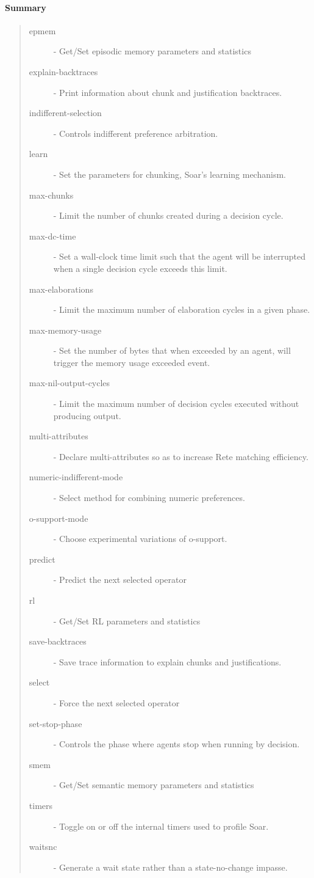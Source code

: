 \paragraph{Summary}
\begin{quote}
\begin{description}
\item[epmem] - Get/Set episodic memory parameters and statistics
\item[explain-backtraces] - Print information about chunk and justification backtraces.
\item[indifferent-selection] -  Controls indifferent preference arbitration.
\item[learn] - Set the parameters for chunking, Soar's learning mechanism.
\item[max-chunks] - Limit the number of chunks created during a decision cycle.
\item[max-dc-time] - Set a wall-clock time limit such that the agent will be interrupted when a single decision cycle exceeds this limit.
\item[max-elaborations] - Limit the maximum number of elaboration cycles in a given phase.
\item[max-memory-usage] - Set the number of bytes that when exceeded by an agent, will trigger the memory usage exceeded event. 
\item[max-nil-output-cycles] - Limit the maximum number of decision cycles executed without producing output. 
\item[multi-attributes] - Declare multi-attributes so as to increase Rete matching efficiency.
\item[numeric-indifferent-mode] - Select method for combining numeric preferences.
\item[o-support-mode] - Choose experimental variations of o-support.
\item[predict] - Predict the next selected operator 
\item[rl] - Get/Set RL parameters and statistics 
\item[save-backtraces] - Save trace information to explain chunks and justifications.
\item[select] - Force the next selected operator 
\item[set-stop-phase] -  Controls the phase where agents stop when running by decision.
\item[smem] - Get/Set semantic memory parameters and statistics
\item[timers] - Toggle on or off the internal timers used to profile Soar.
\item[waitsnc] - Generate a wait state rather than a state-no-change impasse.
\end{description}
\end{quote}


